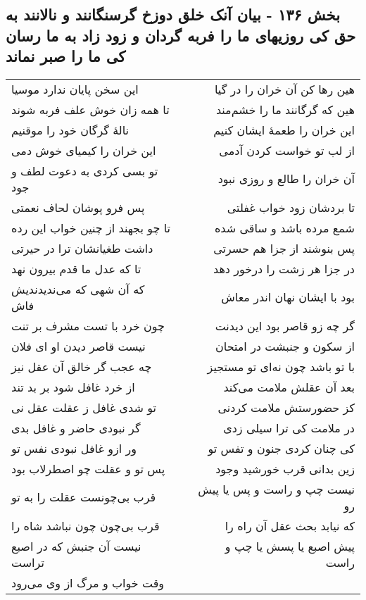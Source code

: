 \begin{center}
\section*{بخش ۱۳۶ - بیان آنک خلق دوزخ گرسنگانند و نالانند به حق کی روزیهای ما را فربه گردان و زود زاد به ما رسان کی ما را صبر نماند}
\label{sec:sh136}
\begin{longtable}{l p{0.5cm} r}
این سخن پایان ندارد موسیا
&&
هین رها کن آن خران را در گیا
\\
تا همه زان خوش علف فربه شوند
&&
هین که گرگانند ما را خشم‌مند
\\
نالهٔ گرگان خود را موقنیم
&&
این خران را طعمهٔ ایشان کنیم
\\
این خران را کیمیای خوش دمی
&&
از لب تو خواست کردن آدمی
\\
تو بسی کردی به دعوت لطف و جود
&&
آن خران را طالع و روزی نبود
\\
پس فرو پوشان لحاف نعمتی
&&
تا بردشان زود خواب غفلتی
\\
تا چو بجهند از چنین خواب این رده
&&
شمع مرده باشد و ساقی شده
\\
داشت طغیانشان ترا در حیرتی
&&
پس بنوشند از جزا هم حسرتی
\\
تا که عدل ما قدم بیرون نهد
&&
در جزا هر زشت را درخور دهد
\\
که آن شهی که می‌ندیدندیش فاش
&&
بود با ایشان نهان اندر معاش
\\
چون خرد با تست مشرف بر تنت
&&
گر چه زو قاصر بود این دیدنت
\\
نیست قاصر دیدن او ای فلان
&&
از سکون و جنبشت در امتحان
\\
چه عجب گر خالق آن عقل نیز
&&
با تو باشد چون نه‌ای تو مستجیز
\\
از خرد غافل شود بر بد تند
&&
بعد آن عقلش ملامت می‌کند
\\
تو شدی غافل ز عقلت عقل نی
&&
کز حضورستش ملامت کردنی
\\
گر نبودی حاضر و غافل بدی
&&
در ملامت کی ترا سیلی زدی
\\
ور ازو غافل نبودی نفس تو
&&
کی چنان کردی جنون و تفس تو
\\
پس تو و عقلت چو اصطرلاب بود
&&
زین بدانی قرب خورشید وجود
\\
قرب بی‌چونست عقلت را به تو
&&
نیست چپ و راست و پس یا پیش رو
\\
قرب بی‌چون چون نباشد شاه را
&&
که نیابد بحث عقل آن راه را
\\
نیست آن جنبش که در اصبع تراست
&&
پیش اصبع یا پسش یا چپ و راست
\\
وقت خواب و مرگ از وی می‌رود

\end{longtable}
\end{center}
